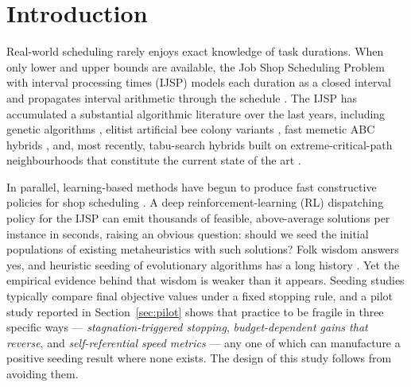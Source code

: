 \documentclass[review]{elsarticle}
\begin{document}
\section{Introduction}\label{sec:intro}

Real-world scheduling rarely enjoys exact knowledge of task durations. When
only lower and upper bounds are available, the Job Shop Scheduling Problem
with interval processing times (IJSP) models each duration as a closed
interval and propagates interval arithmetic through the schedule
\cite{Lei2011,Lei2012}. The IJSP has accumulated a substantial algorithmic
literature over the last years, including genetic algorithms
\cite{DiazIPMU2020}, elitist artificial bee colony variants
\cite{DiazIWINAC2022,DiazESABC2023}, fast memetic ABC hybrids
\cite{DiazNatComp2023}, and, most recently, tabu-search hybrids built on
extreme-critical-path neighbourhoods that constitute the current state of
the art \cite{DiazTSN2}.

In parallel, learning-based methods have begun to produce fast constructive
policies for shop scheduling \cite{ZhangL2D2020,Bengio2021}. A deep
reinforcement-learning (RL) dispatching policy for the IJSP can emit
thousands of feasible, above-average solutions per instance in seconds,
raising an obvious question: should we seed the initial populations of
existing metaheuristics with such solutions? Folk wisdom answers yes, and
heuristic seeding of evolutionary algorithms has a long history
\cite{Kazimipour2014,Louis2004}. Yet the empirical evidence behind that
wisdom is weaker than it appears. Seeding studies typically compare final
objective values under a fixed stopping rule, and a pilot study reported in
Section~\ref{sec:pilot} shows that practice to be fragile in three specific
ways --- \emph{stagnation-triggered stopping}, \emph{budget-dependent gains
that reverse}, and \emph{self-referential speed metrics} --- any one of
which can manufacture a positive seeding result where none exists. The
design of this study follows from avoiding them.
\end{document}
